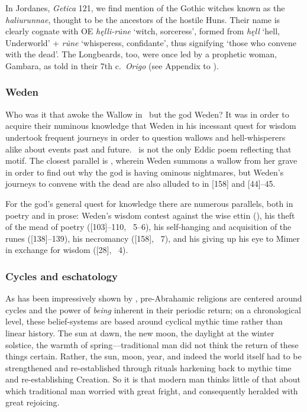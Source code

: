In Jordanes, \emph{Getica} 121, we find mention of the Gothic witches known as the \emph{haliurunnae}, thought to be the ancestors of the hostile Huns.  Their name is clearly cognate with OE \emph{hęlli-ru̇ne} ‘witch, sorceress’, formed from \emph{hęll} ‘hell, Underworld’ + \emph{ru̇ne} ‘whisperess, confidante’, thus signifying ‘those who convene with the dead’.
The Longbeards, too, were once led by a prophetic woman, Gambara, as told in their 7th c.~\emph{Origo} (see Appendix to ).

\subsubsection{Weden}

Who was it that awoke the Wallow in \Voluspa\ but the god Weden?  It was in order to acquire their numinous knowledge that Weden in his incessant quest for wisdom undertook frequent journeys in order to question wallows and hell-whisperers alike about events past and future.  \Voluspa\ is not the only Eddic poem reflecting that motif.  The closest parallel is , wherein Weden summons a wallow from her grave in order to find out why the god  is having ominous nightmares, but Weden’s journeys to convene with the dead are also alluded to in [158] and [44]--45.

For the god’s general quest for knowledge there are numerous parallels, both in poetry and in prose: Weden’s wisdom contest against the wise ettin  (), his theft of the mead of poetry ([103]--110, \Skaldskaparmal\ 5--6), his self-hanging and acquisition of the runes ([138]--139), his necromancy ([158], \YnglingaSaga\ 7), and his giving up his eye to Mimer in exchange for wisdom ([28], \YnglingaSaga\ 4).

\subsubsection{Cycles and eschatology}

As has been impressively shown by \textcite{EliadeReturn}, pre-Abrahamic religions are centered around cycles and the power of \emph{being} inherent in their periodic return; on a chronological level, these belief-systems are based around cyclical mythic time rather than linear history.  The sun at dawn, the new moon, the daylight at the winter solstice, the warmth of spring---traditional man did not think the return of these things certain.  Rather, the sun, moon, year, and indeed the world itself had to be strengthened and re-established through rituals harkening back to mythic time and re-establishing Creation.  So it is that modern man thinks little of that about which traditional man worried with great fright, and consequently heralded with great rejoicing.

